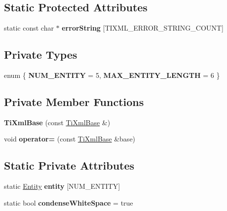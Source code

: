 \subsection*{\-Static \-Protected \-Attributes}
\begin{DoxyCompactItemize}
\item 
static const char $\ast$ {\bfseries error\-String} \mbox{[}\-T\-I\-X\-M\-L\-\_\-\-E\-R\-R\-O\-R\-\_\-\-S\-T\-R\-I\-N\-G\-\_\-\-C\-O\-U\-N\-T\mbox{]}
\end{DoxyCompactItemize}
\subsection*{\-Private \-Types}
\begin{DoxyCompactItemize}
\item 
enum \{ {\bfseries \-N\-U\-M\-\_\-\-E\-N\-T\-I\-T\-Y} =  5, 
{\bfseries \-M\-A\-X\-\_\-\-E\-N\-T\-I\-T\-Y\-\_\-\-L\-E\-N\-G\-T\-H} =  6
 \}
\end{DoxyCompactItemize}
\subsection*{\-Private \-Member \-Functions}
\begin{DoxyCompactItemize}
\item 
\hypertarget{class_ti_xml_base_a626975d7fb27b0a471142ca582b561b4}{{\bfseries \-Ti\-Xml\-Base} (const \hyperlink{class_ti_xml_base}{\-Ti\-Xml\-Base} \&)}\label{class_ti_xml_base_a626975d7fb27b0a471142ca582b561b4}

\item 
\hypertarget{class_ti_xml_base_a183315aa6f1bb36d509b179e912cb93f}{void {\bfseries operator=} (const \hyperlink{class_ti_xml_base}{\-Ti\-Xml\-Base} \&base)}\label{class_ti_xml_base_a183315aa6f1bb36d509b179e912cb93f}

\end{DoxyCompactItemize}
\subsection*{\-Static \-Private \-Attributes}
\begin{DoxyCompactItemize}
\item 
static \hyperlink{struct_ti_xml_base_1_1_entity}{\-Entity} {\bfseries entity} \mbox{[}\-N\-U\-M\-\_\-\-E\-N\-T\-I\-T\-Y\mbox{]}
\item 
\hypertarget{class_ti_xml_base_a447a05f6a3edbb7892f66f9df8244a3d}{static bool {\bfseries condense\-White\-Space} = true}\label{class_ti_xml_base_a447a05f6a3edbb7892f66f9df8244a3d}

\end{DoxyCompactItemize}
